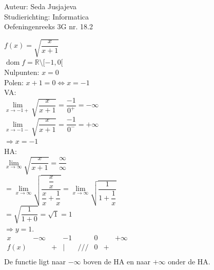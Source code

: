 \documentclass[a4paper]{article}
\newcommand{\limit}{\lim\limits}
\begin{document}
\noindent \large Auteur: Seda Jusjajeva\\
\noindent \large Studierichting: Informatica\\
\noindent \large Oefeningenreeks 3G nr. 18.2 \\

\medskip

\normalsize


$f(x) = \sqrt{\dfrac{x}{x + 1}}$ \\

$\operatorname{dom}f = \mathbb{R} \setminus [-1,0[ $ \\

Nulpunten: $x = 0$ \\

Polen: $x + 1 = 0 \Leftrightarrow x = -1$ \\

VA: \\

$\limit_{x\to-1+} \sqrt{\dfrac{x}{x + 1}} = \dfrac{-1}{0^+} = -\infty$ \\

$\limit_{x\to-1-} \sqrt{\dfrac{x}{x + 1}} = \dfrac{-1}{0^-} = +\infty$ \\

$\Rightarrow x = -1$\\

HA: \\

$\limit_{x\rightarrow \infty} \sqrt{\dfrac{x}{x+1}} = \dfrac{\infty}{\infty} $\\

$= \limit_{x \to \infty} \sqrt{\dfrac{\dfrac{x}{x}}{\dfrac{x}{x} + \dfrac{1}{x}}} = \limit_{x \to \infty} \sqrt{\dfrac{1}{1 + \dfrac{1}{x}}}$ \\

$= \sqrt{\dfrac{1}{1 + 0}} = \sqrt{1} = 1$ \\

$\Rightarrow y = 1$.\\

$\begin{array}{r|ccccccc}
    x    & -\infty &   & -1 &     & 0 &   & +\infty \\ 
    \hline
    f(x) &         & + & |  & /// & 0 & + &\\ 
\end{array}$ \\

De functie ligt naar $-\infty$ boven de HA en naar $+\infty$ onder de HA. \\
\end{document}

